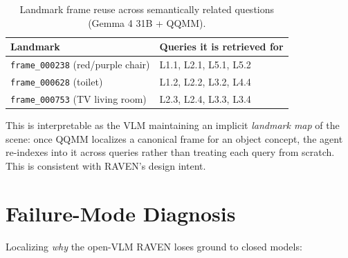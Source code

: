 \documentclass[11pt]{article}
\begin{document}
\begin{table}[h]
\centering
\small
\caption{Landmark frame reuse across semantically related questions (Gemma 4 31B + QQMM).}
\label{tab:reuse}
\begin{tabularx}{\textwidth}{lX}
\toprule
\textbf{Landmark} & \textbf{Queries it is retrieved for} \\
\midrule
\texttt{frame\_000238} (red/purple chair) & L1.1, L2.1, L5.1, L5.2 \\
\texttt{frame\_000628} (toilet)           & L1.2, L2.2, L3.2, L4.4 \\
\texttt{frame\_000753} (TV living room)   & L2.3, L2.4, L3.3, L3.4 \\
\bottomrule
\end{tabularx}
\end{table}

This is interpretable as the VLM maintaining an implicit \emph{landmark map} of the scene: once QQMM localizes a canonical frame for an object concept, the agent re-indexes into it across queries rather than treating each query from scratch. This is consistent with RAVEN's design intent.

\section{Failure-Mode Diagnosis}
\label{sec:failures}

Localizing \emph{why} the open-VLM RAVEN loses ground to closed models:
\end{document}
